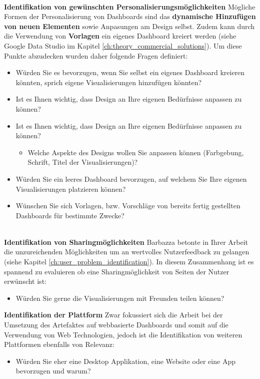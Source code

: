 \noindent
\textbf{\\Identifikation von gewünschten Personalisierungsmöglichkeiten}
\newline
\indent
Mögliche Formen der Personalisierung von Dashboards sind das \textbf{dynamische Hinzufügen von neuen Elementen} sowie Anpasungen am Design selbst. Zudem kann durch die Verwendung von \textbf{Vorlagen} ein eigenes Dashboard kreiert werden (siehe Google Data Studio im Kapitel \ref{ch:theory_commercial_solutions}). Um diese Punkte abzudecken wurden daher folgende Fragen definiert:

\begin{itemize}
    \item Würden Sie es bevorzugen, wenn Sie selbst ein eigenes Dashboard kreieren könnten, sprich eigene Visualisierungen hinzufügen könnten?
    \item Ist es Ihnen wichtig, dass Design an Ihre eigenen Bedürfnisse anpassen zu können?
    \item Ist es Ihnen wichtig, dass Design an Ihre eigenen Bedürfnisse anpassen zu können?
    \begin{itemize}
        \item Welche Aspekte des Designs wollen Sie anpassen können (Farbgebung, Schrift, Titel der Visualisierungen)?
    \end{itemize}
    \item Würden Sie ein leeres Dashboard bevorzugen, auf welchem Sie Ihre eigenen Visualisierungen platzieren können?
    \item Wünschen Sie sich Vorlagen, bzw. Vorschläge von bereits fertig gestellten Dashboards für bestimmte Zwecke?
\end{itemize}

\noindent
\textbf{\\Identifikation von Sharingmöglichkeiten}
\newline
\indent
Barbazza betonte in Ihrer Arbeit die unzureichenden Möglichkeiten um an wertvolles Nutzerfeedback zu gelangen (siehe Kapitel \ref{ch:user_problem_identification}). In diesem Zusammenhang ist es spannend zu evaluieren ob eine Sharingmöglichkeit von Seiten der Nutzer erwünscht ist:
\begin{itemize}
    \item Würden Sie gerne die Visualisierungen mit Freunden teilen können?
\end{itemize}

\clearpage
\noindent
\textbf{Identifikation der Plattform}
\newline
\indent
Zwar fokussiert sich die Arbeit bei der Umsetzung des Artefaktes auf webbasierte Dashboards und somit auf die Verwendung von Web Technologien, jedoch ist die Identifikation von weiteren Plattformen ebenfalls von Relevanz:
\begin{itemize}
    \item Würden Sie eher eine Desktop Applikation, eine Website oder eine App bevorzugen und warum?
\end{itemize}

